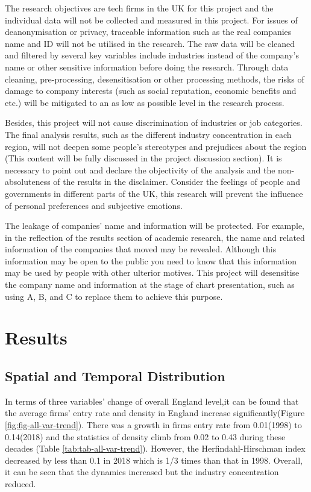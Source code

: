 \documentclass[
  12pt,
  oneside]{book}
\begin{document}
The research objectives are tech firms in the UK for this project and the individual data will not be collected and measured in this project. For issues of deanonymisation or privacy, traceable information such as the real companies name and ID will not be utilised in the research. The raw data will be cleaned and filtered by several key variables include industries instead of the company's name or other sensitive information before doing the research. Through data cleaning, pre-processing, desensitisation or other processing methods, the risks of damage to company interests (such as social reputation, economic benefits and etc.) will be mitigated to an as low as possible level in the research process.

Besides, this project will not cause discrimination of industries or job categories. The final analysis results, such as the different industry concentration in each region, will not deepen some people's stereotypes and prejudices about the region (This content will be fully discussed in the project discussion section). It is necessary to point out and declare the objectivity of the analysis and the non-absoluteness of the results in the disclaimer. Consider the feelings of people and governments in different parts of the UK, this research will prevent the influence of personal preferences and subjective emotions.

The leakage of companies' name and information will be protected. For example, in the reflection of the results section of academic research, the name and related information of the companies that moved may be revealed. Although this information may be open to the public you need to know that this information may be used by people with other ulterior motives. This project will desensitise the company name and information at the stage of chart presentation, such as using A, B, and C to replace them to achieve this purpose.

\hypertarget{results}{%
\chapter{Results}\label{results}}

\hypertarget{spatial-and-temporal-distribution}{%
\section{Spatial and Temporal Distribution}\label{spatial-and-temporal-distribution}}

In terms of three variables' change of overall England level,it can be found that the average firms' entry rate and density in England increase significantly(Figure \ref{fig:fig-all-var-trend}). There was a growth in firms entry rate from 0.01(1998) to 0.14(2018) and the statistics of density climb from 0.02 to 0.43 during these decades (Table \ref{tab:tab-all-var-trend}). However, the Herfindahl-Hirschman index decreased by less than 0.1 in 2018 which is 1/3 times than that in 1998. Overall, it can be seen that the dynamics increased but the industry concentration reduced.
\end{document}
